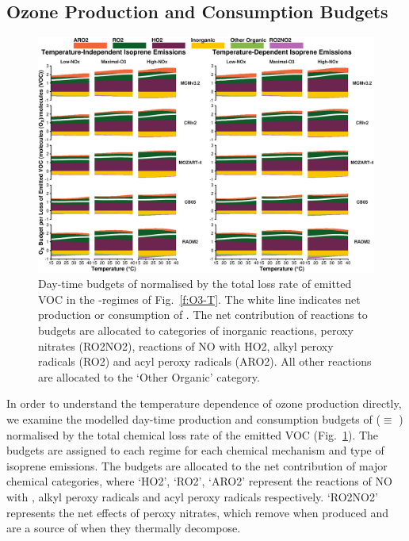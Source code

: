 \subsection{Ozone Production and Consumption Budgets} \label{ss:r_budgets}
\begin{figure}[t]%
    \centering%
    \caption{Day-time budgets of  normalised by the total loss rate of emitted VOC in the -regimes of Fig.~\ref{f:O3-T}. The white line indicates net production or consumption of . The net contribution of reactions to  budgets are allocated to categories of inorganic reactions, peroxy nitrates (RO2NO2), reactions of NO with HO2, alkyl peroxy radicals (RO2) and acyl peroxy radicals (ARO2). All other reactions are allocated to the `Other Organic' category.}%
    \label{f:ozone_budgets}%
    \includegraphics[width = \textwidth]{img/Ox_budgets}%
    \vspace{-4mm}
\end{figure}
% 
In order to understand the temperature dependence of ozone production directly, we examine the modelled day-time production and consumption budgets of  ($\equiv$ ) normalised by the total chemical loss rate of the emitted VOC (Fig.~\ref{f:ozone_budgets}).
The  budgets are assigned to each  regime for each chemical mechanism and type of isoprene emissions.
The budgets are allocated to the net contribution of major chemical categories, where `HO2', `RO2', `ARO2' represent the reactions of NO with , alkyl peroxy radicals and acyl peroxy radicals respectively.
`RO2NO2' represents the net effects of peroxy nitrates, which remove  when produced and are a source of  when they thermally decompose.
